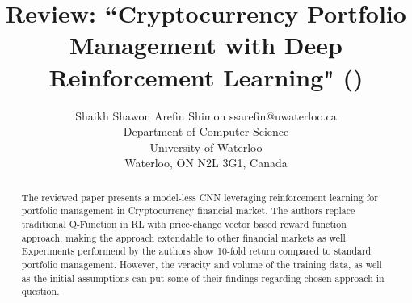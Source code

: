 \documentclass[twoside,11pt]{article}
\begin{document}
\title{Review: ``Cryptocurrency Portfolio Management with Deep Reinforcement Learning" (\cite{8324237})}

\author{\name Shaikh Shawon Arefin Shimon \email ssarefin@uwaterloo.ca \\
       \addr Department of Computer Science\\
       University of Waterloo\\
       Waterloo, ON N2L 3G1, Canada}


\maketitle



\begin{abstract}%
The reviewed paper presents a model-less CNN leveraging reinforcement learning for portfolio management in Cryptocurrency financial market. The authors replace traditional Q-Function in RL with price-change vector based reward function approach, making the approach extendable to other financial markets as well. Experiments performend by the authors show 10-fold return compared to standard portfolio management. However, the veracity and volume of the training data, as well as the initial assumptions can put some of their findings regarding chosen approach in question.
\end{abstract}
\end{document}
